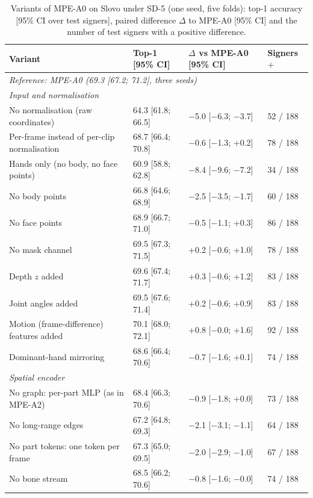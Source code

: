 \documentclass[a4paper,10pt]{article}
\begin{document}
\begin{table}[H]
\caption{Variants of MPE-A0 on Slovo under SD-5 (one seed, five folds): top-1 accuracy [95\% CI over test signers], paired difference $\Delta$ to MPE-A0 [95\% CI] and the number of test signers with a positive difference.}\label{tab:s_abl}
\centering
\footnotesize
\begin{tabular}{llll}
\toprule
\textbf{Variant} & \textbf{Top-1 [95\% CI]} & \textbf{$\Delta$ vs MPE-A0 [95\% CI]} & \textbf{Signers $+$} \\
\midrule
\multicolumn{4}{l}{\textit{Reference: MPE-A0 (69.3 [67.2; 71.2], three seeds)}} \\
\multicolumn{4}{l}{\textit{Input and normalisation}} \\
No normalisation (raw coordinates) & 64.3 [61.8; 66.5] & $-$5.0 [$-$6.3; $-$3.7] & 52 / 188 \\
Per-frame instead of per-clip normalisation & 68.7 [66.4; 70.8] & $-$0.6 [$-$1.3; +0.2] & 78 / 188 \\
Hands only (no body, no face points) & 60.9 [58.8; 62.8] & $-$8.4 [$-$9.6; $-$7.2] & 34 / 188 \\
No body points & 66.8 [64.6; 68.9] & $-$2.5 [$-$3.5; $-$1.7] & 60 / 188 \\
No face points & 68.9 [66.7; 71.0] & $-$0.5 [$-$1.1; +0.3] & 86 / 188 \\
No mask channel & 69.5 [67.3; 71.5] & +0.2 [$-$0.6; +1.0] & 78 / 188 \\
Depth $z$ added & 69.6 [67.4; 71.7] & +0.3 [$-$0.6; +1.2] & 83 / 188 \\
Joint angles added & 69.5 [67.6; 71.4] & +0.2 [$-$0.6; +0.9] & 83 / 188 \\
Motion (frame-difference) features added & 70.1 [68.0; 72.1] & +0.8 [$-$0.0; +1.6] & 92 / 188 \\
Dominant-hand mirroring & 68.6 [66.4; 70.6] & $-$0.7 [$-$1.6; +0.1] & 74 / 188 \\
\multicolumn{4}{l}{\textit{Spatial encoder}} \\
No graph: per-part MLP (as in MPE-A2) & 68.4 [66.3; 70.6] & $-$0.9 [$-$1.8; +0.0] & 73 / 188 \\
No long-range edges & 67.2 [64.8; 69.3] & $-$2.1 [$-$3.1; $-$1.1] & 64 / 188 \\
No part tokens: one token per frame & 67.3 [65.0; 69.5] & $-$2.0 [$-$2.9; $-$1.0] & 67 / 188 \\
No bone stream & 68.5 [66.2; 70.6] & $-$0.8 [$-$1.6; $-$0.0] & 74 / 188 \\

\end{tabular}
\end{table}
\end{document}
